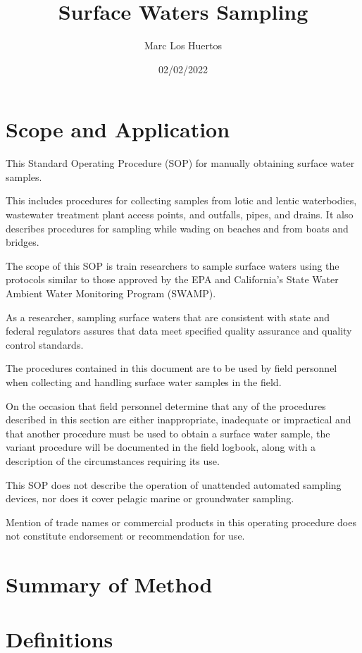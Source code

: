 \documentclass[12pt]{../SOP4_alpha}\usepackage[]{graphicx}\usepackage[]{xcolor}
\title{Surface Waters Sampling}
\date{02/02/2022}
\author{Marc Los Huertos}
\begin{document}
\maketitle

\section{Scope and Application}

\NP This Standard Operating Procedure (SOP) for manually obtaining surface water samples.  

\NP This includes procedures for collecting samples from lotic and lentic waterbodies, wastewater treatment plant access points, and outfalls, pipes, and drains. It also describes procedures for sampling while wading on beaches and from boats and bridges.

\NP The scope of this SOP is train researchers to sample surface waters using the protocols similar to those approved by the EPA and California's State Water Ambient Water Monitoring Program (SWAMP). 

\NP As a researcher, sampling surface waters that are consistent with state and federal regulators assures that data meet specified quality assurance and quality control standards.

\NP The procedures contained in this document are to be used by field personnel when collecting and handling surface water samples in the field.  

\NP On the occasion that field personnel determine that any of the procedures described in this section are either inappropriate, inadequate or impractical and that another procedure must be used to obtain a surface water sample, the variant procedure will be documented in the field logbook, along with a description of the circumstances requiring its use.  

\NP  This SOP does not describe the operation of unattended automated sampling devices, nor does it cover pelagic marine or groundwater sampling. 

\NP Mention of trade names or commercial products in this operating procedure does not constitute endorsement or recommendation for use.

\section{Summary of Method}



\section{Definitions}
\end{document}
